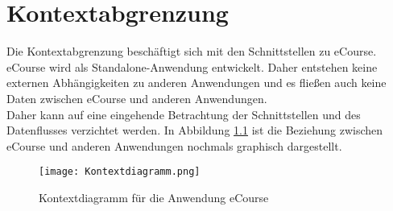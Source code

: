 
\chapter{Kontextabgrenzung}
Die Kontextabgrenzung beschäftigt sich mit den Schnittstellen zu eCourse.
eCourse wird als \gls{Standalone}-Anwendung entwickelt. Daher entstehen keine externen Abhängigkeiten zu anderen Anwendungen und es fließen auch keine Daten zwischen eCourse und anderen Anwendungen. \\
Daher kann auf eine eingehende Betrachtung der Schnittstellen und des Datenflusses verzichtet werden. In Abbildung \ref{fib:Kontext} ist die Beziehung zwischen eCourse und anderen Anwendungen nochmals graphisch dargestellt. 
\begin{figure}[H]
\centering
\texttt{[image: Kontextdiagramm.png]}
\caption{Kontextdiagramm für die Anwendung eCourse}
\label{fib:Kontext}
\end{figure}